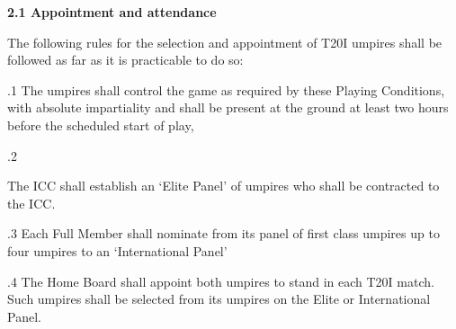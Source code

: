 \documentclass[12pt]{article}
\begin{document}
\vspace{\baselineskip}
{\fontsize{11pt}{13.2pt}\selectfont \textbf{2.1 \tabto{0.47in} Appointment and attendance}\par}\par


\vspace{\baselineskip}
\begin{adjustwidth}{0.0in}{0.03in}
{\fontsize{9pt}{10.8pt}\selectfont The following rules for the selection and appointment of T20I umpires shall be followed as far as it is practicable to do so:\par}\par

\end{adjustwidth}


\vspace{\baselineskip}
\begin{adjustwidth}{0.5in}{0.14in}
{\fontsize{9pt}{10.8pt}.1 \tabto{0.49in} The umpires shall control the game as required by these Playing Conditions, with absolute impartiality and shall be present at the ground at least two hours before the scheduled start of play,\par}\par

\end{adjustwidth}


\vspace{\baselineskip}
{\fontsize{9pt}{10.8pt}.2 \tabto{0.49in} {\fontsize{8pt}{9.6pt}\selectfont The ICC shall establish an ‘Elite Panel’ of umpires who shall be contracted to the ICC.\par}\par}\par


\vspace{\baselineskip}
\begin{adjustwidth}{0.5in}{0.08in}
{\fontsize{9pt}{10.8pt}.3 \tabto{0.49in} Each Full Member shall nominate from its panel of first class umpires up to four umpires to an ‘International Panel’\par}\par

\end{adjustwidth}


\vspace{\baselineskip}
\begin{adjustwidth}{0.5in}{0.18in}
{\fontsize{9pt}{10.8pt}.4 \tabto{0.49in} The Home Board shall appoint both umpires to stand in each T20I match. Such umpires shall be selected from its umpires on the Elite or International Panel.\par}\par

\end{adjustwidth}
\end{document}
